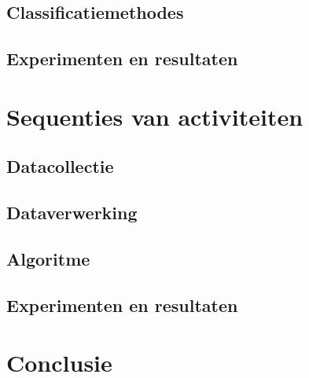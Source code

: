 \documentclass{article}
\begin{document}
\subsection{Classificatiemethodes}


\subsection{Experimenten en resultaten}


\section{Sequenties van activiteiten}


\subsection{Datacollectie}


\subsection{Dataverwerking}


\subsection{Algoritme}


\subsection{Experimenten en resultaten}


\section{Conclusie}
\end{document}
